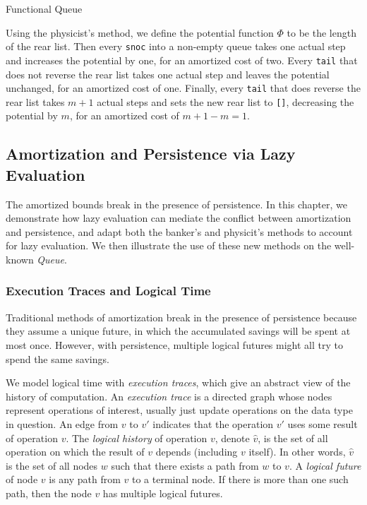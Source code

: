 \documentclass[12pt, a4paper]{article} %
\newcommand{\code}[1]{\texttt{#1}} %
\begin{document}
\begin{listing}[H]
    \inputminted[breaklines=true]{haskell}{../../Chapter5/BatchedQueue.hs}
    \caption{Functional Queue}
    \label{lst:queue}
\end{listing}


Using the physicist's method, we define the potential function $\Phi$ to be the length of the rear list. Then every \code{snoc} into a non-empty queue takes one actual step and increases the potential by one, for an amortized cost of two. Every \code{tail} that does not reverse the rear list takes one actual step and leaves the potential unchanged, for an amortized cost of one. Finally, every \code{tail} that does reverse the rear list takes $m+1$ actual steps and sets the new rear list to \code{[]}, decreasing the potential by $m$, for an amortized cost of $m + 1 - m = 1$.





\subsection{Amortization and Persistence via Lazy Evaluation}%
\label{sub:Amortization and Persistence via Lazy Evaluation}

The amortized bounds break in the presence of persistence. In this chapter, we demonstrate how lazy evaluation can mediate the conflict between amortization and persistence, and adapt both the banker's and physicit's methods to account for lazy evaluation. We then illustrate the use of these new methods on the well-known \textit{Queue}.

\subsubsection{Execution Traces and Logical Time}%

Traditional methods of amortization break in the presence of persistence because they assume a unique future, in which the accumulated savings will be spent at most once. However, with persistence, multiple logical futures might all try to spend the same savings.

We model logical time with \textit{execution traces}, which give an abstract view of the history of computation. An \textit{execution trace} is a directed graph whose nodes represent operations of interest, usually just update operations on the data type in question. An edge from $v$ to $v'$ indicates that the operation $v'$ uses some result of operation $v$. The \textit{logical history} of operation $v$, denote $\hat{v}$, is the set of all operation on which the result of $v$ depends (including $v$ itself). In other words, $\hat{v}$ is the set of all nodes $w$ such that there exists a path from $w$ to $v$. A \textit{logical future} of node $v$ is any path from $v$ to a terminal node. If there is more than one such path, then the node $v$ has multiple logical futures.
\end{document}
